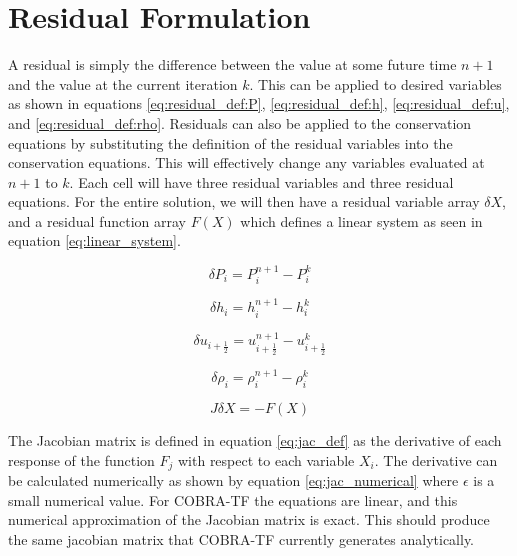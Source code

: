 \vspace*{-80mm}
\chapter{Residual Formulation} \label{chapter3:residual_formulation}
	    
    A residual is simply the difference between the value at some future time
    $n+1$ and the value at the current iteration $k$. This can be applied to
    desired variables as shown in equations
    \eqref{eq:residual_def:P}, \eqref{eq:residual_def:h},
    \eqref{eq:residual_def:u}, and \eqref{eq:residual_def:rho}. Residuals can
    also be applied to the conservation equations by substituting the definition
    of the residual variables into the conservation equations. This will
    effectively change any variables evaluated at $n+1$ to $k$. Each cell will
    have three residual variables and three residual equations. For the entire
    solution, we will then have a residual variable array $\delta X$, and a
    residual function array $F(X)$ which defines a linear system as seen in 
    equation \eqref{eq:linear_system}.
        
    \begin{equation}
    	\label{eq:residual_def:P}
    	\delta P_{i} = P^{n+1}_{i} - P^{k}_{i}
    \end{equation}
    
    \begin{equation}
    	\label{eq:residual_def:h}
    	\delta h_{i} = h^{n+1}_{i} - h^{k}_{i}
    \end{equation}
    
    \begin{equation}
    	\label{eq:residual_def:u}
    	\delta u_{i+\frac{1}{2}} = u^{n+1}_{i+\frac{1}{2}} - u^{k}_{i+\frac{1}{2}}
    \end{equation}
    
    \begin{equation}
    	\label{eq:residual_def:rho}
    	\delta \rho_{i} = \rho^{n+1}_{i} - \rho^{k}_{i}
    \end{equation}
    
    \begin{equation}
    	\label{eq:linear_system}
    	J \delta X = - F(X)
    \end{equation}
    
    The Jacobian matrix is defined in equation \eqref{eq:jac_def} as the derivative
    of each response of the function $F_{j}$ with respect to each variable $X_{i}$.
    The derivative can be calculated numerically as shown by equation
    \eqref{eq:jac_numerical} where $\epsilon$ is a small numerical value. For
    COBRA-TF the equations are linear, and this numerical approximation
    of the Jacobian matrix is exact. This should produce the same jacobian
    matrix that COBRA-TF currently generates analytically. 
    
